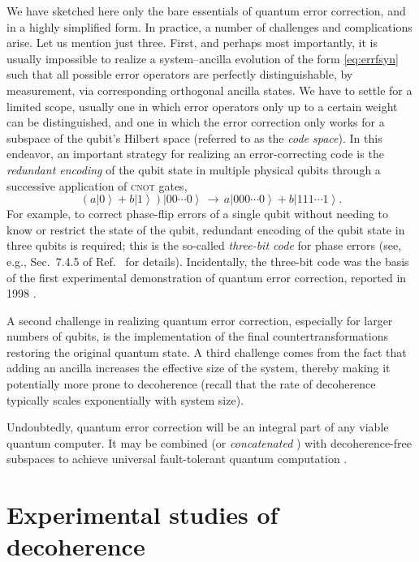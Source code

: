 \documentclass[3p,sort&compress]{elsarticle}
\newcommand{\ket}[1]{\left\vert{#1}\right\rangle}
\begin{document}
We have sketched here only the bare essentials of quantum error correction, and in a highly simplified form. In practice, a number of challenges and complications arise. Let us mention just three. First, and perhaps most importantly, it is usually impossible to realize a system--ancilla evolution of the form \eqref{eq:errfsyn} such that all possible error operators are perfectly distinguishable, by measurement, via corresponding orthogonal ancilla states. We have  to settle for a limited scope, usually one in which error operators only up to a certain weight can be distinguished, and one in which the error correction only works for a subspace of the qubit's Hilbert space (referred to as the \emph{code space}). In this endeavor, an important strategy for realizing an error-correcting code is the \emph{redundant encoding} of the qubit state in multiple physical qubits through a successive application of \textsc{cnot} gates, 
%
\begin{equation}\label{eq:snba}
  \left(a\ket{0} + b\ket{1}\right)\ket{0 0 \cdots
    0 }  \,\longrightarrow\, a \ket{0 0 0 \cdots
    0 } + b \ket{1 1 1 \cdots 1 }.
\end{equation}
%
For example, to correct phase-flip errors of a single qubit without needing to know or restrict the state of the qubit, redundant encoding of the qubit state in three qubits is required; this is the so-called \emph{three-bit code} for phase errors (see, e.g., Sec.~7.4.5 of Ref.~\cite{Schlosshauer:2007:un} for details). Incidentally, the three-bit code was the basis of the first experimental demonstration of quantum error correction, reported in 1998 \cite{Cory:1998:uu}.

A second challenge in realizing quantum error correction, especially for larger numbers of qubits, is the implementation of the final countertransformations restoring the original quantum state. A third challenge comes from the fact that adding an ancilla increases the effective size of the system, thereby making it potentially more prone to decoherence (recall that the rate of decoherence typically scales exponentially with system size). 

Undoubtedly, quantum error correction will be an integral part of any viable quantum computer. It may be combined (or \emph{concatenated} \cite{Lidar:1999:fa}) with decoherence-free subspaces to achieve universal fault-tolerant quantum computation \cite{Bacon:2000:yy,Lidar:2001:oo}.

\section{\label{sec:exper-observ-decoh}Experimental studies of decoherence}
\end{document}

